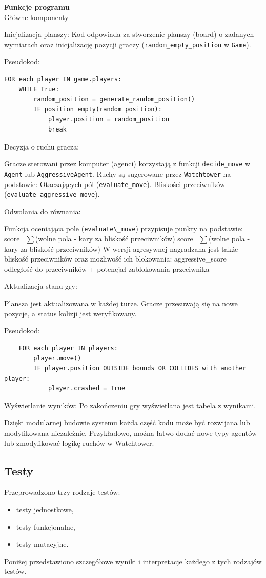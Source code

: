 \documentclass[12pt,a4paper]{article}
\begin{document}
\textbf{Funkcje programu}\\
Główne komponenty

    Inicjalizacja planszy:
        Kod odpowiada za stworzenie planszy (board) o zadanych wymiarach oraz inicjalizację pozycji graczy (\verb|random_empty_position| w \verb|Game|).

    Pseudokod:
\begin{lstlisting}
FOR each player IN game.players:
    WHILE True:
        random_position = generate_random_position()
        IF position_empty(random_position):
            player.position = random_position
            break
	\end{lstlisting}

Decyzja o ruchu gracza:

    Gracze sterowani przez komputer (agenci) korzystają z funkcji \verb|decide_move| w \verb|Agent| lub \verb|AggressiveAgent|.
    Ruchy są sugerowane przez \verb|Watchtower| na podstawie:
        Otaczających pól (\verb|evaluate_move|).
        Bliskości przeciwników (\verb|evaluate_aggressive_move|).

Odwołania do równania:

    Funkcja oceniająca pole (\verb|evaluate\_move|) przypisuje punkty na podstawie:
    score=$\sum$(wolne pola - kary za bliskość przeciwników)
    score=$\sum$(wolne pola - kary za bliskość przeciwników)
    W wersji agresywnej nagradzana jest także bliskość przeciwników oraz możliwość ich blokowania: aggressive\_score = odległość do przeciwników + potencjał zablokowania przeciwnika

Aktualizacja stanu gry:

    Plansza jest aktualizowana w każdej turze. Gracze przesuwają się na nowe pozycje, a status kolizji jest weryfikowany.

Pseudokod:
\begin{lstlisting}
    FOR each player IN players:
        player.move()
        IF player.position OUTSIDE bounds OR COLLIDES with another player:
            player.crashed = True
	\end{lstlisting}

    Wyświetlanie wyników:
        Po zakończeniu gry wyświetlana jest tabela z wynikami.

Dzięki modularnej budowie systemu każda część kodu może być rozwijana lub modyfikowana niezależnie. Przykładowo, można łatwo dodać nowe typy agentów lub zmodyfikować logikę ruchów w Watchtower.
    
\newpage
	\subsection*{Testy}
Przeprowadzono trzy rodzaje testów:
\begin{itemize}
    \item testy jednostkowe,
    \item testy funkcjonalne,
    \item testy mutacyjne.
\end{itemize}
Poniżej przedstawiono szczegółowe wyniki i interpretacje każdego z tych rodzajów testów.
\end{document}
